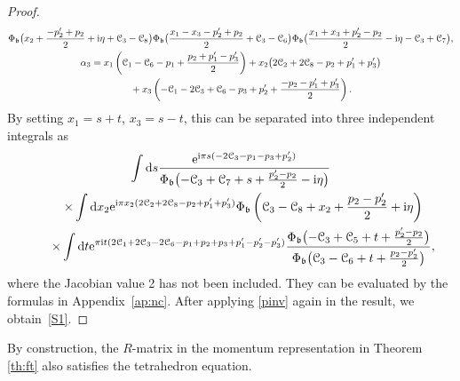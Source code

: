 \documentclass[pdftex]{sigma}
\newcommand{\bb}{{\mathfrak b}}
\newcommand{\e}{{\mathrm e}}
\numberwithin{equation}{section}
\begin{document}
\begin{proof}
\begin{gather*}
{\Phi_{\bb}\bigl(x_2+\frac{-p'_2+p_2}{2}+{\rm i}\eta+{\mathcal C}_3-{\mathcal C}_8\bigr)}
{\Phi_{\bb}\bigl(\frac{x_1-x_3-p'_2+p_2}{2}+{\mathcal C}_3-{\mathcal C}_6\bigr)
\Phi_{\bb}\bigl(\frac{x_1+x_3+p'_2-p_2}{2}-{\rm i}\eta-{\mathcal C}_3+{\mathcal C}_7\bigr)},
\\
\alpha_3 = x_1\left({\mathcal C}_1-{\mathcal C}_6-p_1+\frac{p_2+p'_1-p'_3}{2}\right)
+ x_2\bigl(2{\mathcal C}_2+2{\mathcal C}_8-p_2+p'_1+p'_3\bigr)
 \\
 \phantom{\alpha_3 =}{} +x_3\left(-{\mathcal C}_1-2{\mathcal C}_3+{\mathcal C}_6-p_3+p'_2+\frac{-p_2-p'_1+p'_3}{2}\right).
\end{gather*}
By setting $x_1=s+t$, $x_3=s-t$, this can be separated into three
independent integrals as
\begin{gather*}
\int {\rm d}s \frac{\e^{{\rm i}\pi s(-2{\mathcal C}_3-p_1-p_3+p'_2)}}
{\Phi_{\bb}\bigl(-{\mathcal C}_3+{\mathcal C}_7+s+\frac{p'_2-p_2}{2}-{\rm i}\eta\bigr)}
\nonumber\\
\qquad \times
\int {\rm d}x_2 \e^{{\rm i}\pi x_2(2{\mathcal C}_2+2{\mathcal C}_8-p_2+p'_1+p'_3)}
\Phi_{\bb}\left({\mathcal C}_3-{\mathcal C}_8+x_2+\frac{p_2-p'_2}{2}+{\rm i}\eta\right)
\nonumber \\
\qquad\times
\int {\rm d}t
\e^{\pi {\rm i}t(2{\mathcal C}_1+2{\mathcal C}_3-2{\mathcal C}_6-p_1+p_2+p_3+p'_1-p'_2-p'_3)}
\frac{\Phi_{\bb}\bigl(-{\mathcal C}_3+{\mathcal C}_5+t+\frac{p'_2-p_2}{2}\bigr)}
{\Phi_{\bb}\bigl({\mathcal C}_3-{\mathcal C}_6+t+\frac{p_2-p'_2}{2}\bigr)},
\end{gather*}
where the Jacobian value 2 has not been included.
They can be evaluated by the formulas in Appendix~\ref{ap:nc}.
After applying \eqref{pinv} again in the result, we obtain~\eqref{S1}.
\end{proof}

By construction, the $R$-matrix in the momentum representation
 in Theorem \ref{th:ft}
also satisfies the tetrahedron equation.
\end{document}
